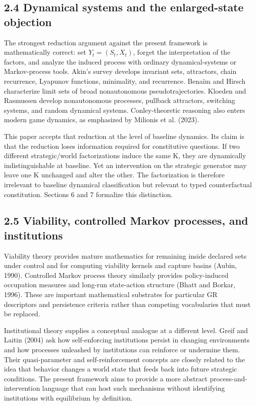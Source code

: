 \documentclass[10pt]{article}
\begin{document}
\subsection{2.4 Dynamical systems and the enlarged-state
objection}\label{dynamical-systems-and-the-enlarged-state-objection}

The strongest reduction argument against the present framework is
mathematically correct: set \(Y_t=(S_t,X_t)\), forget the interpretation
of the factors, and analyze the induced process with ordinary
dynamical-systems or Markov-process tools. Akin's survey develops
invariant sets, attractors, chain recurrence, Lyapunov functions,
minimality, and recurrence. Benaïm and Hirsch characterize limit sets of
broad nonautonomous pseudotrajectories. Kloeden and Rasmussen develop
nonautonomous processes, pullback attractors, switching systems, and
random dynamical systems. Conley-theoretic reasoning also enters modern
game dynamics, as emphasized by Milionis et al. (2023).

This paper accepts that reduction at the level of baseline dynamics. Its
claim is that the reduction loses information required for constitutive
questions. If two different strategic/world factorizations induce the
same K, they are dynamically indistinguishable at baseline. Yet an
intervention on the strategic generator may leave one K unchanged and
alter the other. The factorization is therefore irrelevant to baseline
dynamical classification but relevant to typed counterfactual
constitution. Sections 6 and 7 formalize this distinction.

\subsection{2.5 Viability, controlled Markov processes, and
institutions}\label{viability-controlled-markov-processes-and-institutions}

Viability theory provides mature mathematics for remaining inside
declared sets under control and for computing viability kernels and
capture basins (Aubin, 1990). Controlled Markov process theory similarly
provides policy-induced occupation measures and long-run state-action
structure (Bhatt and Borkar, 1996). These are important mathematical
substrates for particular GR descriptors and persistence criteria rather
than competing vocabularies that must be replaced.

Institutional theory supplies a conceptual analogue at a different
level. Greif and Laitin (2004) ask how self-enforcing institutions
persist in changing environments and how processes unleashed by
institutions can reinforce or undermine them. Their quasi-parameter and
self-reinforcement concepts are closely related to the idea that
behavior changes a world state that feeds back into future strategic
conditions. The present framework aims to provide a more abstract
process-and-intervention language that can host such mechanisms without
identifying institutions with equilibrium by definition.
\end{document}
